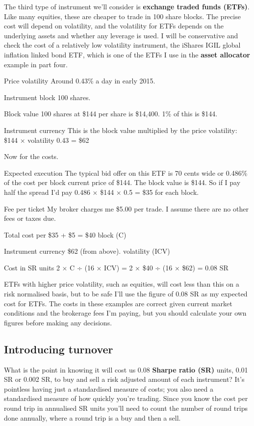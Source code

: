The third type of instrument we'll consider is \textbf{exchange traded funds (ETFs)}. Like many equities, these are cheaper to trade in 100 share blocks. The precise cost will depend on volatility, and the volatility for ETFs depends on the underlying assets and whether any leverage is used. I will be conservative and check the cost of a relatively low volatility instrument, the iShares IGIL global inflation linked bond ETF, which is one of the ETFs I use in the \textbf{asset allocator} example in part four.

Price volatility Around 0.43\% a day in early 2015.

Instrument block 100 shares.

Block value 100 shares at \$144 per share is \$14,400. 1\% of this is \$144.

Instrument currency This is the block value multiplied by the price volatility: \$144 × volatility 0.43 = \$62

Now for the costs.

Expected execution The typical bid offer on this ETF is 70 cents wide or 0.486\% of the cost per block current price of \$144. The block value is \$144. So if I pay half the spread I'd pay 0.486 × \$144 × 0.5 = \$35 for each block.

Fee per ticket My broker charges me \$5.00 per trade. I assume there are no other fees or taxes due.

Total cost per \$35 + \$5 = \$40 block (C)

Instrument currency \$62 (from above). volatility (ICV)

Cost in SR units 2 × C ÷ (16 × ICV) = 2 × \$40 ÷ (16 × \$62) = 0.08 SR

ETFs with higher price volatility, such as equities, will cost less than this on a risk normalised basis, but to be safe I'll use the figure of 0.08 SR as my expected cost for ETFs. The costs in these examples are correct given current market conditions and the brokerage fees I'm paying, but you should calculate your own figures before making any decisions.

\subsection*{Introducing turnover}

What is the point in knowing it will cost us 0.08 \textbf{Sharpe ratio (SR)} units, 0.01 SR or 0.002 SR, to buy and sell a risk adjusted amount of each instrument? It's pointless having just a standardised measure of costs; you also need a standardised measure of how quickly you're trading. Since you know the cost per round trip in annualised SR units you'll need to count the number of round trips done annually, where a round trip is a buy and then a sell.


